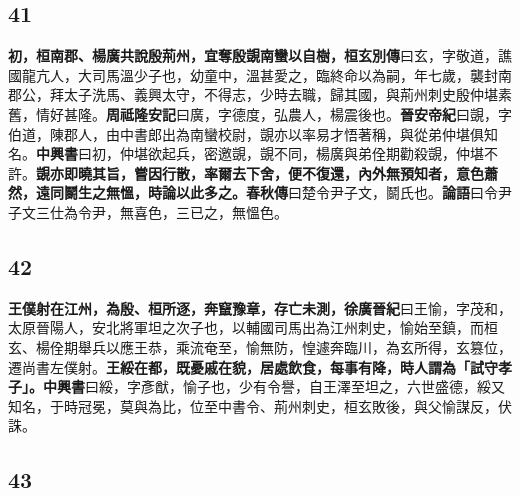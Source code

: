 \subsection*{41}

\textbf{初，桓南郡、楊廣共說殷荊州，宜奪殷覬南蠻以自樹，}{\footnotesize \textbf{桓玄別傳}曰玄，字敬道，譙國龍亢人，大司馬溫少子也，幼童中，溫甚愛之，臨終命以為嗣，年七歲，襲封南郡公，拜太子洗馬、義興太守，不得志，少時去職，歸其國，與荊州刺史殷仲堪素舊，情好甚隆。\textbf{周祗隆安記}曰廣，字德度，弘農人，楊震後也。\textbf{晉安帝紀}曰覬，字伯道，陳郡人，由中書郎出為南蠻校尉，覬亦以率易才悟著稱，與從弟仲堪俱知名。\textbf{中興書}曰初，仲堪欲起兵，密邀覬，覬不同，楊廣與弟佺期勸殺覬，仲堪不許。}\textbf{覬亦即曉其旨，嘗因行散，率爾去下舍，便不復還，內外無預知者，意色蕭然，遠同鬬生之無慍，時論以此多之。}{\footnotesize \textbf{春秋傳}曰楚令尹子文，鬬氏也。\textbf{論語}曰令尹子文三仕為令尹，無喜色，三已之，無慍色。}

\subsection*{42}

\textbf{王僕射在江州，為殷、桓所逐，奔竄豫章，存亡未測，}{\footnotesize \textbf{徐廣晉紀}曰王愉，字茂和，太原晉陽人，安北將軍坦之次子也，以輔國司馬出為江州刺史，愉始至鎮，而桓玄、楊佺期舉兵以應王恭，乘流奄至，愉無防，惶遽奔臨川，為玄所得，玄篡位，遷尚書左僕射。}\textbf{王綏在都，既憂戚在貌，居處飲食，每事有降，時人謂為「試守孝子」。}{\footnotesize \textbf{中興書}曰綏，字彥猷，愉子也，少有令譽，自王澤至坦之，六世盛德，綏又知名，于時冠冕，莫與為比，位至中書令、荊州刺史，桓玄敗後，與父愉謀反，伏誅。}

\subsection*{43}


